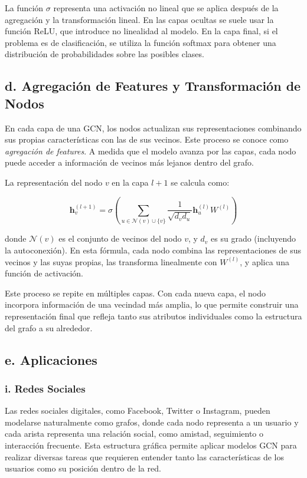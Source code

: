 \documentclass[11pt]{article} %
\begin{document}
La función $\sigma$ representa una activación no lineal que se aplica después de la agregación y la transformación lineal. En las capas ocultas se suele usar la función ReLU, que introduce no linealidad al modelo. En la capa final, si el problema es de clasificación, se utiliza la función softmax para obtener una distribución de probabilidades sobre las posibles clases.

\subsection{d. Agregación de Features y Transformación de Nodos}

En cada capa de una GCN, los nodos actualizan sus representaciones combinando sus propias características con las de sus vecinos. Este proceso se conoce como \textit{agregación de features}. A medida que el modelo avanza por las capas, cada nodo puede acceder a información de vecinos más lejanos dentro del grafo.

La representación del nodo $v$ en la capa $l+1$ se calcula como:

\[
\mathbf{h}_v^{(l+1)} = \sigma \left( \sum_{u \in \mathcal{N}(v) \cup \{v\}} \frac{1}{\sqrt{d_v d_u}} \mathbf{h}_u^{(l)} W^{(l)} \right)
\]

donde $\mathcal{N}(v)$ es el conjunto de vecinos del nodo $v$, y $d_v$ es su grado (incluyendo la autoconexión). En esta fórmula, cada nodo combina las representaciones de sus vecinos y las suyas propias, las transforma linealmente con $W^{(l)}$, y aplica una función de activación.

Este proceso se repite en múltiples capas. Con cada nueva capa, el nodo incorpora información de una vecindad más amplia, lo que permite construir una representación final que refleja tanto sus atributos individuales como la estructura del grafo a su alrededor.


\subsection{e. Aplicaciones}

\subsubsection{i. Redes Sociales}

Las redes sociales digitales, como Facebook, Twitter o Instagram, pueden modelarse naturalmente como grafos, donde cada nodo representa a un usuario y cada arista representa una relación social, como amistad, seguimiento o interacción frecuente. Esta estructura gráfica permite aplicar modelos GCN para realizar diversas tareas que requieren entender tanto las características de los usuarios como su posición dentro de la red.
\end{document}
